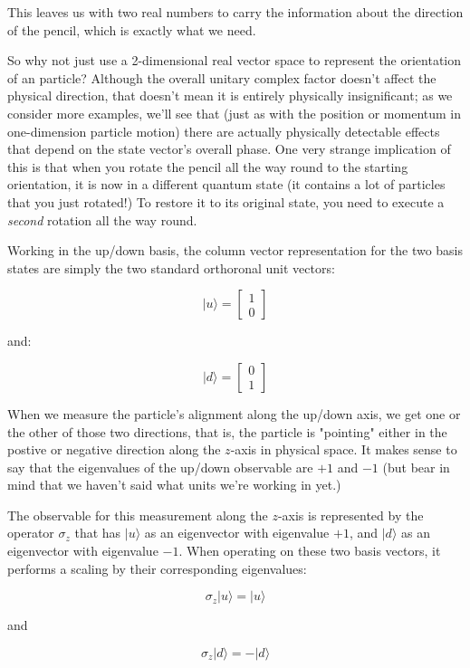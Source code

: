 This leaves us with two real numbers to carry the information about the direction of the pencil, which is exactly what we need.

So why not just use a 2-dimensional real vector space to represent the orientation of an particle? Although the overall unitary complex factor doesn't affect the physical direction, that doesn't mean it is entirely physically insignificant; as we consider more examples, we'll see that (just as with the position or momentum in one-dimension particle motion) there are actually physically detectable effects that depend on the state vector's overall phase. One very strange implication of this is that when you rotate the pencil all the way round to the starting orientation, it is now in a different quantum state (it contains a lot of particles that you just rotated!) To restore it to its original state, you need to execute a \textit{second} rotation all the way round.

Working in the up/down basis, the column vector representation for the two basis states are simply the two standard orthoronal unit vectors:

$$|u \rangle = \begin{bmatrix} 1 \\ 0 \end{bmatrix}$$

and:

$$|d \rangle = \begin{bmatrix} 0 \\ 1 \end{bmatrix}$$

When we measure the particle's alignment along the up/down axis, we get one or the other of those two directions, that is, the particle is "pointing" either in the postive or negative direction along the $z$-axis in physical space. It makes sense to say that the eigenvalues of the up/down observable are $+1$ and $-1$ (but bear in mind that we haven't said what units we're working in yet.)

The observable for this measurement along the $z$-axis is represented by the operator $\sigma_z$ that has $|u\rangle$ as an eigenvector with eigenvalue $+1$, and $|d\rangle$ as an eigenvector with eigenvalue $-1$. When operating on these two basis vectors, it performs a scaling by their corresponding eigenvalues:

$$\sigma_z |u\rangle = |u\rangle$$

and

$$\sigma_z |d\rangle = - |d\rangle$$

